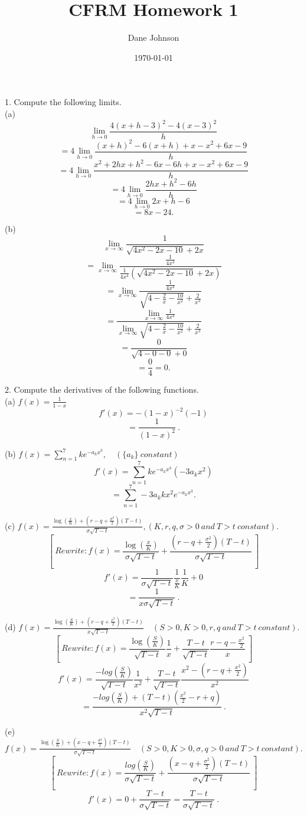 \documentclass[11pt]{article}
\begin{document}
\title{CFRM Homework 1}
\author{Dane Johnson}
\date{\today}
\maketitle

1. Compute the following limits.\\

(a)$$\lim_{h\to0} \frac{4(x+h-3)^2 - 4(x-3)^2}{h}$$
$$ = 4\lim_{h\to0} \frac{(x+h)^2 - 6(x+h) + x - x^2 + 6x - 9}{h}$$
$$ = 4\lim_{h\to0} \frac{x^2+2hx+h^2 - 6x - 6h + x - x^2 + 6x - 9}{h}$$
$$ = 4\lim_{h\to0} \frac{2hx + h^2 - 6h}{h}$$
$$ = 4\lim_{h\to0} 2x + h - 6$$
$$ = 8x - 24. $$

(b)$$\lim_{x\to\infty} \frac{1}{\sqrt{4x^2-2x-10}+2x}$$
$$=\lim_{x\to\infty} \frac{\frac{1}{4x^4}}{\frac{1}{4x^4}(\sqrt{4x^2-2x-10}+2x)}$$
$$=\lim_{x\to\infty} \frac{\frac{1}{4x^4}}{\sqrt{4-\frac{2}{x}-\frac{10}{x^2}}+\frac{2}{x^3}}$$
$$ = \frac{\lim_{x\to\infty}\frac{1}{4x^4}}{\lim_{x\to\infty}\sqrt{4-\frac{2}{x}-\frac{10}{x^2}}+\frac{2}{x^3}}$$
$$=\frac{0}{\sqrt{4 - 0 - 0} + 0}$$
$$=\frac{0}{4} = 0.$$

2. Compute the derivatives of the following functions.\\

(a)	$f(x) = \frac{1}{1-x}$
$$f'(x) = -(1-x)^{-2}(-1)$$
$$		= \frac{1}{(1-x)^2}\:.$$

(b)	$f(x) = \sum\limits_{n=1}^{7} ke^{-a_kx^3},\quad (\{a_k\} \: constant)$
$$f'(x) = \sum\limits_{n=1}^{7} ke^{-a_kx^3}(-3a_kx^2)$$
$$ = \sum\limits_{n=1}^{7} -3a_kkx^2e^{-a_kx^3}.$$

(c)	$f(x) = \frac{\log(\frac{x}{K}) + (r-q+\frac{\sigma^2}{2})(T-t)}{\sigma\sqrt{T-t}},  (K,r,q,\sigma > 0\: and\: T>t \: constant).$
$$[\:Rewrite : f(x)=\frac{\log(\frac{x}{K})}{\sigma\sqrt{T-t}} + \frac{(r-q+\frac{\sigma^2}{2})(T-t)}{\sigma\sqrt{T-t}}\:]$$
$$f'(x) = \frac{1}{\sigma\sqrt{T-t}}\frac{1}{\frac{x}{K}}\frac{1}{K} + 0$$
$$=\frac{1}{x\sigma\sqrt{T-t}}\:.$$

(d) $f(x) = \frac{\log(\frac{S}{K}) + (r-q+\frac{x^2}{2})(T-t)}{x\sqrt{T-t}}\quad(S>0,K>0,r,q\: and \: T>t \: constant).$
$$[\:Rewrite : f(x) = \frac{\log(\frac{S}{K})}{\sqrt{T-t}}\frac{1}{x} + \frac{T-t}{\sqrt{T-t}}\frac{r-q-\frac{x^2}{2}}{x}\:]$$
$$f'(x) = \frac{-log(\frac{S}{K})}{\sqrt{T-t}}\frac{1}{x^2} + \frac{T-t}{\sqrt{T-t}}\frac{x^2-(r-q+\frac{x^2}{2})}{x^2}$$
$$=\frac{-log(\frac{S}{K}) + (T-t)(\frac{x^2}{2}-r+q)}{x^2\sqrt{T-t}}\:.$$

(e)	$f(x) = \frac{\log(\frac{S}{K}) + (x-q+\frac{\sigma^2}{2})(T-t)}{\sigma\sqrt{T-t}}\quad(S>0,K>0,\sigma,q>0\: and \: T>t \: constant).$
$$[\:Rewrite : f(x) = \frac{log(\frac{S}{K})}{\sigma\sqrt{T-t}} + \frac{(x-q+\frac{\sigma^2}{2})(T-t)}{\sigma\sqrt{T-t}}\:]$$
$$f'(x) = 0 + \frac{T-t}{\sigma\sqrt{T-t}} = \frac{T-t}{\sigma\sqrt{T-t}}\:.$$
\end{document}
